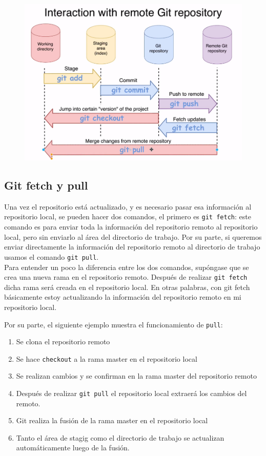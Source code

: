 \begin{figure}[H]
    \centering
    \includegraphics[scale=0.5]{Github/Git_f9.png}
\end{figure}

\subsection{Git fetch y pull}

Una vez el repositorio está actualizado, y es necesario pasar esa información al repositorio local, se pueden hacer dos comandos, el primero es \texttt{git fetch}: este comando es para enviar toda la información del repositorio remoto al repositorio local, pero sin enviarlo al área del directorio de trabajo. Por su parte, si queremos enviar directamente la información del repositorio remoto al directorio de trabajo usamos el comando \texttt{git pull}. \\

Para entender un poco la diferencia entre los dos comandos, supóngase que se crea una nueva rama en el repositorio remoto. Después de realizar \texttt{git fetch} dicha rama será creada en el repositorio local. En otras palabras, con git fetch básicamente estoy actualizando la información del repositorio remoto en mi repositorio local.

Por su parte, el siguiente ejemplo muestra el funcionamiento de \texttt{pull}:

\begin{enumerate}
    \item Se clona el repositorio remoto
    \item Se hace \texttt{checkout} a la rama master en el repositorio local
    \item Se realizan cambios y se confirman en la rama master del repositorio remoto
    \item Después de realizar \texttt{git pull} el repositorio local extraerá los cambios del remoto.
    \item Git realiza la fusión de la rama master en el repositorio local 
    \item Tanto el área de stagig como el directorio de trabajo se actualizan automáticamente luego de la fusión.
\end{enumerate}

